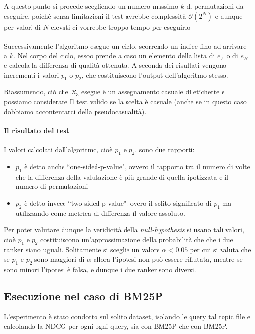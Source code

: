 A questo punto si procede scegliendo un numero massimo $k$ di permutazioni
da eseguire, poichè  senza limitazioni  il test avrebbe complessità $\mathcal{O}(2^N)$
e dunque per valori di $N$ elevati ci vorrebbe troppo tempo per eseguirlo.
\\
\\
Successivamente l'algoritmo esegue un ciclo, scorrendo un indice fino ad arrivare a $k$.
Nel corpo del ciclo, essoo prende a caso un elemento della lista di $e_A$ o di $e_B$ e
calcola la differenza di qualità ottenuta.
A seconda dei risultati vengono incrementi i valori $p_1$ o $p_2$, che costituiscono
l'output dell'algoritmo stesso.

Riassumendo, ciò che $\mathcal{R}_3$ esegue è un assegnamento casuale di etichette e
possiamo considerare Il test valido se la scelta è casuale (anche se in questo caso
dobbiamo accontentarci della pseudocasualità).

\paragraph{Il risultato del test}
I valori calcolati dall'algoritmo, cioè $p_1$ e $p_2$, sono due rapporti:

\begin{itemize}
	\item $p_1$ è detto anche ``one-sided-p-value", ovvero il rapporto tra il numero di volte che la differenza
	della valutazione è più grande di quella ipotizzata e il numero di permutazioni
	\item $p_2$ è detto invece ``two-sided-p-value", overo il solito significato di $p_1$ ma utilizzando
	come metrica di differenza il valore assoluto.
\end{itemize}


Per poter valutare dunque la veridicità della \textit{null-hypothesis} si usano tali valori,
cioè $p_1$ e $p_2$ costituiscono un'approssimazione della probabilità che che i due ranker
siano uguali. Solitamente si sceglie un valore $\alpha < 0.05$ per cui si valuta che
se $p_1$ e $p_2$ sono maggiori di $\alpha$ allora l'ipotesi non può essere rifiutata,
mentre se sono minori l'ipotesi è falsa, e dunque i due ranker sono diversi.


\subsection{Esecuzione nel caso di BM25P}
L'esperimento è stato condotto sul solito dataset, isolando le query tal topic file e calcolando la NDCG
per ogni ogni query, sia con BM25P che con BM25P.

